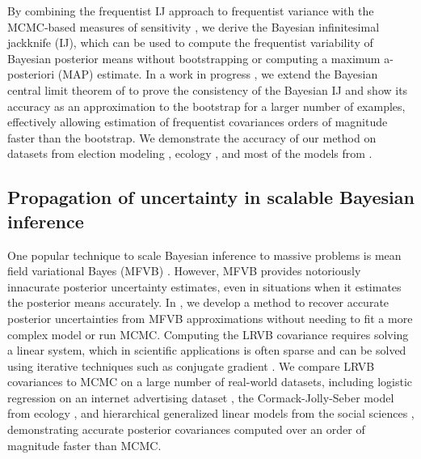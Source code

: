By combining the frequentist IJ \citep{jaeckel:1972:infinitesimal,
shao:2012:jackknife, giordano:2019:ij} approach to frequentist variance with the
MCMC-based measures of sensitivity \citep{gustafson:2012:localrobustnessbook,
giordano:2018:covariances}, we derive the Bayesian infinitesimal jackknife (IJ),
which can be used to compute the frequentist variability of Bayesian posterior
means without bootstrapping or computing a maximum a-posteriori (MAP) estimate.
In a work in progress \citep{giordano:2020:bayesij}, we extend the Bayesian
central limit theorem of \citet{lehman:1983:pointestimation,
kass:1990:posteriorexpansions} to prove the consistency of the Bayesian IJ and
show its accuracy as an approximation to the bootstrap for a larger number of
examples, effectively allowing estimation of frequentist covariances orders of
magnitude faster than the bootstrap.  We demonstrate the accuracy of our method
on datasets from election modeling \citep{economist:2020:election}, ecology
\citep{kery:2011:bayesian}, and most of the models from \citep{gelman:2006:arm,
stan-examples:2017}.



\subsection*{Propagation of uncertainty in scalable Bayesian inference}

One popular technique to scale Bayesian inference to massive problems is mean
field variational Bayes (MFVB) \citep{wainwright:2008:graphical,
blei:2017:variational, regier:2019:cataloging}.  However, MFVB provides
notoriously innacurate posterior uncertainty estimates, even in situations when
it estimates the posterior means accurately. In
\citep{giordano:2018:covariances}, we develop a method to recover accurate
posterior uncertainties from MFVB approximations without needing to fit a more
complex model or run MCMC. Computing the LRVB covariance requires solving a
linear system, which in scientific applications is often sparse and can be
solved using iterative techniques such as conjugate gradient \citep[Chapter
5]{nocedal:2006:numerical}.  We compare LRVB covariances to MCMC on a large
number of real-world datasets, including logistic regression on an internet
advertising dataset \citep{criteo:2014:dataset}, the Cormack-Jolly-Seber model
from ecology \citep{kery:2011:bayesian}, and hierarchical generalized linear
models from the social sciences \citep{gelman:2006:arm}, demonstrating accurate
posterior covariances computed over an order of magnitude faster than MCMC.



